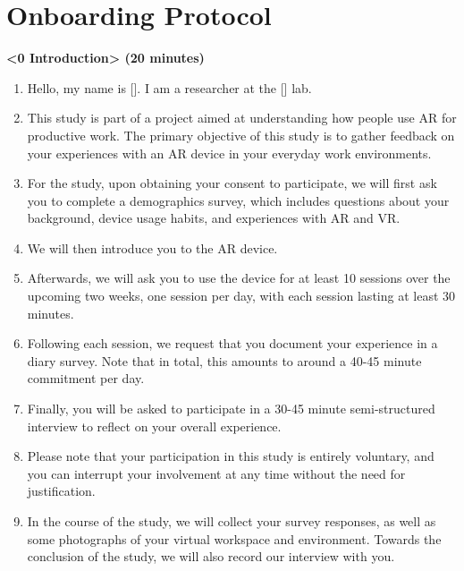 
\section{Onboarding Protocol}

\textbf{<0 Introduction> (20 minutes)}

\begin{enumerate}[label=(\arabic*)]
\item Hello, my name is []. I am a researcher at the [] lab. 

\item This study is part of a project aimed at understanding how people use AR for productive work. The primary objective of this study is to gather feedback on your experiences with an AR device in your everyday work environments.

\item For the study, upon obtaining your consent to participate, we will first ask you to complete a demographics survey, which includes questions about your background, device usage habits, and experiences with AR and VR. 

\item We will then introduce you to the AR device. 

\item Afterwards, we will ask you to use the device for at least 10 sessions over the upcoming two weeks, one session per day, with each session lasting at least 30 minutes. 

\item Following each session, we request that you document your experience in a diary survey.
Note that in total, this amounts to around a 40-45 minute commitment per day. 

\item Finally, you will be asked to participate in a 30-45 minute semi-structured interview to reflect on your overall experience.

\item Please note that your participation in this study is entirely voluntary, and you can interrupt your involvement at any time without the need for justification. 

\item In the course of the study, we will collect your survey responses, as well as some photographs of your virtual workspace and environment. Towards the conclusion of the study, we will also record our interview with you. 


\end{enumerate}
